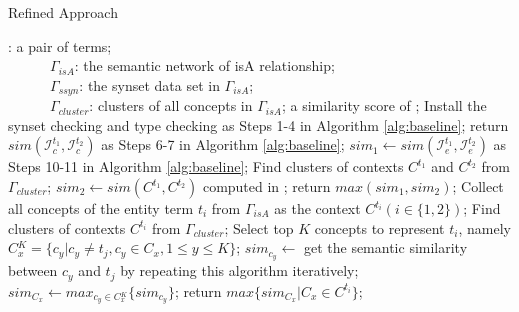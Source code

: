 %
%

\renewcommand\algorithmicrequire{\textbf{Input:}}
\renewcommand\algorithmicensure {\textbf{Output:}}
\begin{algorithm}[th]
\caption{Refined Approach}
\label{alg:refined}
\begin{algorithmic}[1]
\REQUIRE {}: a pair of terms;\\
~~~~~~$\Gamma_{isA}$: the semantic network of isA relationship;\\
~~~~~~$\Gamma_{ssyn}$: the synset data set in $\Gamma_{isA}$;\\
~~~~~~$\Gamma_{cluster}$: clusters of all concepts in $\Gamma_{isA}$;
\ENSURE a similarity score of ;
\STATE Install the synset checking and type checking as Steps 1-4 in Algorithm \ref{alg:baseline};
\STATE return $sim(\mathcal{I}_c^{t_1}, \mathcal{I}_c^{t_2})$ as Steps 6-7 in Algorithm \ref{alg:baseline};
\ENDIF
{}
\STATE $sim_1\leftarrow sim(\mathcal{I}_e^{t_1}, \mathcal{I}_e^{t_2})$ as Steps 10-11 in Algorithm \ref{alg:baseline};
\STATE Find clusters of contexts $C^{t_1}$ and $C^{t_2}$ from $\Gamma_{cluster}$;%
\STATE $sim_2\leftarrow sim(C^{t_1}, C^{t_2})$ computed in ;
\STATE return $max(sim_1, sim_2)$;
\ENDIF
{}
\STATE Collect all concepts of the entity term $t_i$ from $\Gamma_{isA}$ as the context $C^{t_i} (i\in\{1, 2\})$;
\STATE Find clusters of contexts $C^{t_i}$ from $\Gamma_{cluster}$;%
\STATE Select top $K$ concepts to represent $t_i$, namely $C{^{K}_{x}}=\{c_y|c_y \neq t_j,c_y\in C_x, 1\leq y \leq K\}$;
\STATE $sim_{c_y}\leftarrow$ get the semantic similarity between $c_y$ and $t_j$ by repeating this algorithm iteratively;
\ENDFOR
\STATE $sim_{C_x}\leftarrow max_{c_y\in C{^{K}_{x}}}\{sim_{c_y}\}$;
\ENDFOR
\STATE return $max\{sim_{C_x}|C_x\in C^{t_i}\}$;
\ENDIF
\end{algorithmic}
\end{algorithm}


